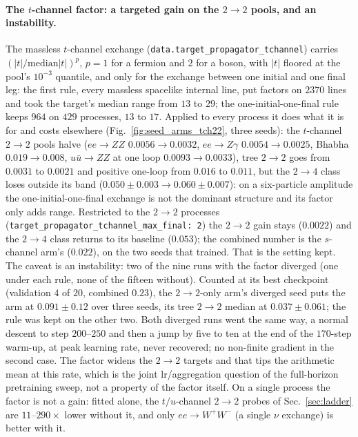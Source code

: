 \documentclass[11pt]{article}
\newcommand{\code}[1]{\texttt{#1}}
\begin{document}
\paragraph{The $t$-channel factor: a targeted gain on the $2\to2$ pools, and an instability.}
The massless $t$-channel exchange (\code{data.target\_propagator\_tchannel}) carries
$(|t|/\mathrm{median}|t|)^p$, $p=1$ for a fermion and $2$ for a boson, with $|t|$ floored at
the pool's $10^{-3}$ quantile, and only for the exchange between one initial and one final
leg: the first rule, every massless spacelike internal line, put factors on $2370$ lines and
took the target's median range from $13$ to $29$; the one-initial-one-final rule keeps $964$
on $429$ processes, $13$ to $17$. Applied to every process it does what it is for and costs
elsewhere (Fig.~\ref{fig:seed_arms_tch22}, three seeds): the $t$-channel $2\to2$ pools halve
($ee\to ZZ$ $0.0056\to0.0032$, $ee\to Z\gamma$ $0.0054\to0.0025$, Bhabha $0.019\to0.008$,
$u\bar u\to ZZ$ at one loop $0.0093\to0.0033$), tree $2\to2$ goes from $0.0031$ to $0.0021$
and positive one-loop from $0.016$ to $0.011$, but the $2\to4$ class loses outside its band
($0.050\pm0.003\to0.060\pm0.007$): on a six-particle amplitude the one-initial-one-final
exchange is not the dominant structure and its factor only adds range. Restricted to the
$2\to2$ processes (\code{target\_propagator\_tchannel\_max\_final: 2}) the $2\to2$ gain stays
($0.0022$) and the $2\to4$ class returns to its baseline ($0.053$); the combined number is the
$s$-channel arm's ($0.022$), on the two seeds that trained. That is the setting kept. The caveat
is an instability: two of the nine runs with the factor diverged (one under each rule, none of
the fifteen without). Counted at its best checkpoint (validation $4$ of $20$, combined $0.23$),
the $2\to2$-only arm's diverged seed puts the arm at $0.091\pm0.12$ over three seeds, its tree
$2\to2$ median at $0.037\pm0.061$; the rule was kept on the other two. Both diverged runs went
the same way, a normal descent to step $200$--$250$ and then a jump by five to ten at the
end of the $170$-step warm-up, at peak learning rate, never recovered; no non-finite
gradient in the second case. The factor widens the $2\to2$ targets and that tips the
arithmetic mean at this rate, which is the joint lr/aggregation question of the full-horizon pretraining sweep, not a
property of the factor itself. On a single process the factor is not a gain: fitted alone, the
$t/u$-channel $2\to2$ probes of Sec.~\ref{sec:ladder} are $11$--$290\times$ lower without it, and
only $ee\to W^+W^-$ (a single $\nu$ exchange) is better with it.
\end{document}
